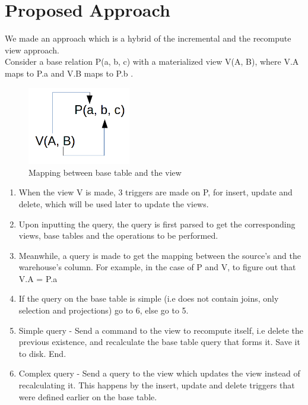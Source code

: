 \documentclass[12pt]{report}
\begin{document}
\section{Proposed Approach}
We made an approach which is a hybrid of the incremental and the recompute view approach. \\Consider a base relation P(a, b, c) with a materialized view V(A, B), where V.A maps to P.a and V.B maps to P.b .
\begin{figure}[H]
\centering \includegraphics[width=0.4\textwidth]{images/mapping.png}
\caption{Mapping between base table and the view}
\end{figure}
\begin{enumerate}
  \item When the view V is made, 3 triggers are made on P, for insert, update and delete, which will be used later to update the views.
  \item Upon inputting the query, the query is first parsed to get the corresponding views, base tables and the operations to be performed.
  \item Meanwhile, a query is made to get the mapping between the source's and the warehouse's column. For example, in the case of P and V, to figure out that V.A = P.a
  \item If the query on the base table is simple (i.e does not contain joins, only selection and projections) go to 6, else go to 5.
  \item Simple query - Send a command to the view to recompute itself, i.e delete the previous existence, and recalculate the base table query that forms it. Save it to 	              disk. End.
  \item Complex query - Send a query to the view which updates the view instead of recalculating it. This happens by the insert, update and delete triggers that were 			         defined earlier on the base table.\\
\end{enumerate}
\end{document}
